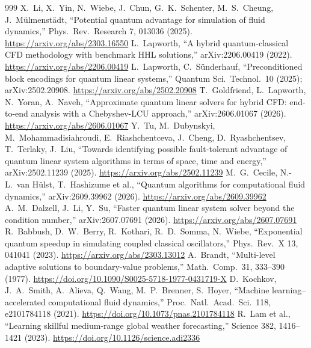 \begin{thebibliography}{999}
 X.~Li, X.~Yin, N.~Wiebe, J.~Chun, G.~K.~Schenter, M.~S.~Cheung, J.~M\"ulmenst\"adt, ``Potential quantum advantage for simulation of fluid dynamics,'' Phys.\ Rev.\ Research 7, 013036 (2025). \url{https://arxiv.org/abs/2303.16550}
 L.~Lapworth, ``A hybrid quantum-classical CFD methodology with benchmark HHL solutions,'' arXiv:2206.00419 (2022). \url{https://arxiv.org/abs/2206.00419}
 L.~Lapworth, C.~S\"underhauf, ``Preconditioned block encodings for quantum linear systems,'' Quantum Sci.\ Technol.\ 10 (2025); arXiv:2502.20908. \url{https://arxiv.org/abs/2502.20908}
 T.~Goldfriend, L.~Lapworth, N.~Yoran, A.~Naveh, ``Approximate quantum linear solvers for hybrid CFD: end-to-end analysis with a Chebyshev-LCU approach,'' arXiv:2606.01067 (2026). \url{https://arxiv.org/abs/2606.01067}
 Y.~Tu, M.~Dubynskyi, M.~Mohammadisiahroudi, E.~Riashchentceva, J.~Cheng, D.~Ryashchentsev, T.~Terlaky, J.~Liu, ``Towards identifying possible fault-tolerant advantage of quantum linear system algorithms in terms of space, time and energy,'' arXiv:2502.11239 (2025). \url{https://arxiv.org/abs/2502.11239}
 M.~G.~Cecile, N.-L.~van H\"ulst, T.~Hashizume et al., ``Quantum algorithms for computational fluid dynamics,'' arXiv:2609.39962 (2026). \url{https://arxiv.org/abs/2609.39962}
 A.~M.~Dalzell, J.~Li, Y.~Su, ``Faster quantum linear system solver beyond the condition number,'' arXiv:2607.07691 (2026). \url{https://arxiv.org/abs/2607.07691}
 R.~Babbush, D.~W.~Berry, R.~Kothari, R.~D.~Somma, N.~Wiebe, ``Exponential quantum speedup in simulating coupled classical oscillators,'' Phys.\ Rev.\ X 13, 041041 (2023). \url{https://arxiv.org/abs/2303.13012}
 A.~Brandt, ``Multi-level adaptive solutions to boundary-value problems,'' Math.\ Comp.\ 31, 333--390 (1977). \url{https://doi.org/10.1090/S0025-5718-1977-0431719-X}
 D.~Kochkov, J.~A.~Smith, A.~Alieva, Q.~Wang, M.~P.~Brenner, S.~Hoyer, ``Machine learning--accelerated computational fluid dynamics,'' Proc.\ Natl.\ Acad.\ Sci.\ 118, e2101784118 (2021). \url{https://doi.org/10.1073/pnas.2101784118}
 R.~Lam et al., ``Learning skillful medium-range global weather forecasting,'' Science 382, 1416--1421 (2023). \url{https://doi.org/10.1126/science.adi2336}
\end{thebibliography}


